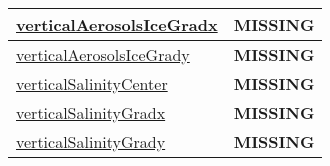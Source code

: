 {\begin{center}
\begin{longtable}{| p{2.0in} | p{4.0in} |}
    \hline
    \hyperref[subsec:var_sec_tracer_reconstruction_verticalAerosolsIceGradx]{verticalAerosolsIceGradx} & {\bf \color{red} MISSING} \\
    \hline
    \hyperref[subsec:var_sec_tracer_reconstruction_verticalAerosolsIceGrady]{verticalAerosolsIceGrady} & {\bf \color{red} MISSING} \\
    \hline
    \hyperref[subsec:var_sec_tracer_reconstruction_verticalSalinityCenter]{verticalSalinityCenter} & {\bf \color{red} MISSING} \\
    \hline
    \hyperref[subsec:var_sec_tracer_reconstruction_verticalSalinityGradx]{verticalSalinityGradx} & {\bf \color{red} MISSING} \\
    \hline
    \hyperref[subsec:var_sec_tracer_reconstruction_verticalSalinityGrady]{verticalSalinityGrady} & {\bf \color{red} MISSING} \\
    \hline
\end{longtable}
\end{center}
}
